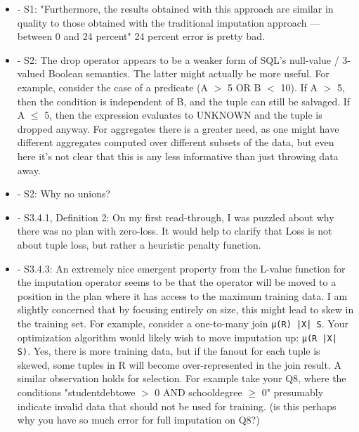\documentclass[draft,12pt]{article}
\newcommand{\resp}[1]{{\color{blue}{#1}}}
\begin{document}
\begin{itemize}
\item - S1: "Furthermore, the results obtained with this approach are similar in quality to those obtained with the traditional imputation approach — between 0 and 24 percent" 24 percent error is pretty bad. 

\item - S2: The drop operator appears to be a weaker form of SQL's null-value / 3-valued Boolean semantics. The latter might actually be more useful. For example, consider the case of a predicate (A $>$ 5 OR B $<$ 10). If A $>$ 5, then the condition is independent of B, and the tuple can still be salvaged. If A $\leq$ 5, then the expression evaluates to UNKNOWN and the tuple is dropped anyway. For aggregates there is a greater need, as one might have different aggregates computed over different subsets of the data, but even here it's not clear that this is any less informative than just throwing data away. 

\item - S2: Why no unions?
  
\resp{We skipped unions for brevity. There is nothing fundamental about our algorithm which makes unions difficult to implement.}

\item - S3.4.1, Definition 2: On my first read-through, I was puzzled about why there was no plan with zero-loss. It would help to clarify that Loss is not about tuple loss, but rather a heuristic penalty function. 

\item - S3.4.3: An extremely nice emergent property from the L-value function for the imputation operator seems to be that the operator will be moved to a position in the plan where it has access to the maximum training data. I am slightly concerned that by focusing entirely on size, this might lead to skew in the training set. For example, consider a one-to-many join \verb/µ(R) |X| S/. Your optimization algorithm would likely wish to move imputation up: \verb/µ(R |X| S)/. Yes, there is more training data, but if the fanout for each tuple is skewed, some tuples in R will become over-represented in the join result. A similar observation holds for selection. For example take your Q8, where the conditions "studentdebtowe $>$ 0 AND schooldegree $\geq$ 0" presumably indicate invalid data that should not be used for training. (is this perhaps why you have so much error for full imputation on Q8?)



\end{itemize}
\end{document}
